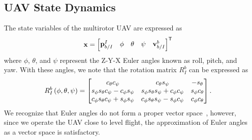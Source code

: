 
\subsection{UAV State Dynamics}
The state variables of the multirotor UAV are expressed as
\begin{equation}
  \boldsymbol{\mathrm{x}} =
    \begin{bmatrix}
      \boldsymbol{\mathrm{p}}_{b/I}^{I} & 
      \phi & \theta & \psi &
      \boldsymbol{\mathrm{v}}_{b/I}^{b} 
    \end{bmatrix}^{\mathsf{T}}
\end{equation}
where $\phi$, $\theta$, and $\psi$ represent the Z-Y-X Euler angles known as
roll, pitch, and yaw. With these angles, we note that the rotation matrix
$R_I^b$ can be expressed as
\begin{equation*}
  R_I^b \left( \phi, \theta, \psi \right) =
  \begin{bmatrix}
    c_\theta c_\psi & c_\theta s_\psi & -s_\theta \\
    s_\phi s_\theta c_\psi - c_\phi s_\psi & s_\phi s_\theta s_\psi + c_\phi
    c_\psi & s_\phi c_\theta \\
    c_\phi s_\theta c_\psi + s_\phi s_\psi & c_\phi s_\theta s_\psi - s_\phi
    c_\psi & c_\phi c_\theta
  \end{bmatrix}.
\end{equation*}
We recognize that Euler angles do not form a proper vector space~\cite{??},
however, since we operate the UAV close to level flight, the approximation of
Euler angles as a vector space is satisfactory.

